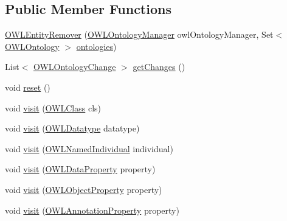 \subsection*{Public Member Functions}
\begin{DoxyCompactItemize}
\item 
\hyperlink{classorg_1_1semanticweb_1_1owlapi_1_1util_1_1_o_w_l_entity_remover_aca652a07af6a611828afc9e0bcf854f7}{O\-W\-L\-Entity\-Remover} (\hyperlink{interfaceorg_1_1semanticweb_1_1owlapi_1_1model_1_1_o_w_l_ontology_manager}{O\-W\-L\-Ontology\-Manager} owl\-Ontology\-Manager, Set$<$ \hyperlink{interfaceorg_1_1semanticweb_1_1owlapi_1_1model_1_1_o_w_l_ontology}{O\-W\-L\-Ontology} $>$ \hyperlink{classorg_1_1semanticweb_1_1owlapi_1_1util_1_1_o_w_l_entity_remover_a49abe27183ac14719a0def399db5981c}{ontologies})
\item 
List$<$ \hyperlink{classorg_1_1semanticweb_1_1owlapi_1_1model_1_1_o_w_l_ontology_change}{O\-W\-L\-Ontology\-Change} $>$ \hyperlink{classorg_1_1semanticweb_1_1owlapi_1_1util_1_1_o_w_l_entity_remover_a30e4fe1833f99b368a260d0c36633a79}{get\-Changes} ()
\item 
void \hyperlink{classorg_1_1semanticweb_1_1owlapi_1_1util_1_1_o_w_l_entity_remover_abe92013b93b159b5f3553d22454f80ee}{reset} ()
\item 
void \hyperlink{classorg_1_1semanticweb_1_1owlapi_1_1util_1_1_o_w_l_entity_remover_a5a4c741e3d266f87a4e04827f32d3a84}{visit} (\hyperlink{interfaceorg_1_1semanticweb_1_1owlapi_1_1model_1_1_o_w_l_class}{O\-W\-L\-Class} cls)
\item 
void \hyperlink{classorg_1_1semanticweb_1_1owlapi_1_1util_1_1_o_w_l_entity_remover_a5414bc06cf9fb27c581fa2099d059ab4}{visit} (\hyperlink{interfaceorg_1_1semanticweb_1_1owlapi_1_1model_1_1_o_w_l_datatype}{O\-W\-L\-Datatype} datatype)
\item 
void \hyperlink{classorg_1_1semanticweb_1_1owlapi_1_1util_1_1_o_w_l_entity_remover_a1fa676027fae3b74d1c21d3c5915d2a6}{visit} (\hyperlink{interfaceorg_1_1semanticweb_1_1owlapi_1_1model_1_1_o_w_l_named_individual}{O\-W\-L\-Named\-Individual} individual)
\item 
void \hyperlink{classorg_1_1semanticweb_1_1owlapi_1_1util_1_1_o_w_l_entity_remover_ac8c935004eaa8ed0ae3947d261c4576b}{visit} (\hyperlink{interfaceorg_1_1semanticweb_1_1owlapi_1_1model_1_1_o_w_l_data_property}{O\-W\-L\-Data\-Property} property)
\item 
void \hyperlink{classorg_1_1semanticweb_1_1owlapi_1_1util_1_1_o_w_l_entity_remover_ab48b3104c3201bfa9def0cb297ae3422}{visit} (\hyperlink{interfaceorg_1_1semanticweb_1_1owlapi_1_1model_1_1_o_w_l_object_property}{O\-W\-L\-Object\-Property} property)
\item 
void \hyperlink{classorg_1_1semanticweb_1_1owlapi_1_1util_1_1_o_w_l_entity_remover_afc66dd79f7bfa2ee997af485fb35d398}{visit} (\hyperlink{interfaceorg_1_1semanticweb_1_1owlapi_1_1model_1_1_o_w_l_annotation_property}{O\-W\-L\-Annotation\-Property} property)
\end{DoxyCompactItemize}
